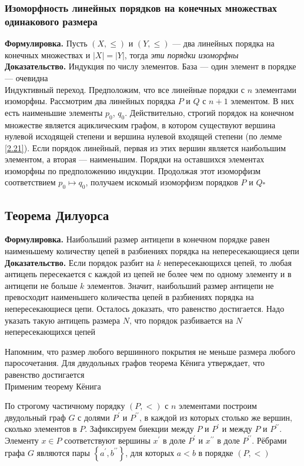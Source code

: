 \documentclass[a4paper]{article}
\newcommand{\qed}{\hfill$\square$}
\begin{document}
\subsubsection*{Изоморфность линейных порядков на конечных множествах одинакового размера}
\textbf{Формулировка.} Пусть $(X,\leqslant)$ и $(Y,\leqslant)$ — два линейных порядка на конечных множествах и $|X|=|Y|$, тогда \textit{эти порядки изоморфны}\\[2mm]
\indent\textbf{Доказательство.} Индукция по числу элементов. База — один элемент в порядке — очевидна\\[2mm]
\indent Индуктивный переход. Предположим, что все линейные порядки с $n$ элементами изоморфны. Рассмотрим два линейных порядка $P$ и $Q$ с $n + 1$ элементом. В них есть наименьшие элементы $p_0$, $q_0$. Действительно, строгий порядок на конечном множестве является ациклическим графом, в котором существуют вершина нулевой исходящей степени и вершина нулевой входящей степени (по лемме \ref{2.21}). Если порядок линейный, первая из этих вершин является наибольшим элементом, а вторая — наименьшим. Порядки на оставшихся элементах изоморфны по предположению индукции. Продолжая этот изоморфизм соответствием $p_0\mapsto q_0$, получаем искомый изоморфизм порядков $P$ и $Q$\qed



\subsection{Теорема Дилуорса}
\textbf{Формулировка.} Наибольший размер антицепи в конечном порядке равен наименьшему количеству цепей в разбиениях порядка на непересекающиеся цепи\\[2mm]
\indent\textbf{Доказательство.} Если порядок разбит на $k$ непересекающихся цепей, то любая антицепь пересекается с каждой из цепей не более 
чем по одному элементу и в антицепи не больше $k$ элементов. Значит, наибольший размер антицепи не превосходит наименьшего количества цепей в 
разбиениях порядка на непересекающиеся цепи. Осталось доказать, что равенство достигается. Надо указать такую антицепь размера $N$, 
что порядок разбивается на $N$ непересекающихся цепей

Напомним, что размер любого вершинного покрытия не меньше размера любого паросочетания. 
Для двудольных графов теорема Кёнига утверждает, что равенство достигается\\
Применим теорему Кёнига

По строгому частичному порядку $(P,<)$ с $n$ элементами построим двудольный граф $G$ с долями $P^{\prime}$ и $P^{\prime \prime}$, в каждой из 
которых столько же вершин, сколько элементов в $P$. Зафиксируем биекции между $P$ и $P^{\prime}$ и между $P$ и $P^{\prime \prime}$. Элементу 
$x \in P$ соответствуют вершины $x^{\prime}$ в доле $P^{\prime}$ и $x^{\prime \prime}$ в доле $P^{\prime \prime}$. Рёбрами графа $G$ являются пары $\left\{a^{\prime}, b^{\prime \prime}\right\}$, 
для которых $a<b$ в порядке $(P,<)$
\end{document}
